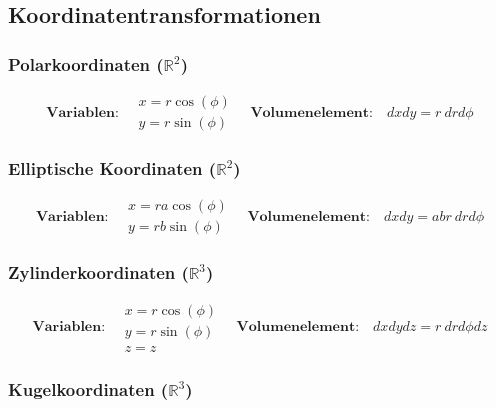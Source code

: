 \documentclass[11pt]{article}
\begin{document}
\subsection{Koordinatentransformationen}

\subsubsection{Polarkoordinaten ($\mathbb{R}^2$)}

\begin{equation*}
	\textbf{Variablen:}\quad \begin{matrix}
		x = r\cos(\phi) \\ y = r\sin(\phi)
	\end{matrix} \quad \textbf{Volumenelement:}\quad dxdy = r\ drd\phi
\end{equation*}

\subsubsection{Elliptische Koordinaten ($\mathbb{R}^2$)}

\begin{equation*}
	\textbf{Variablen:}\quad \begin{matrix}
		x = ra\cos(\phi) \\ y = rb\sin(\phi)
	\end{matrix} \quad \textbf{Volumenelement:}\quad dxdy = abr\ drd\phi
\end{equation*}

\subsubsection{Zylinderkoordinaten ($\mathbb{R}^3$)}

\begin{equation*}
	\textbf{Variablen:}\quad \begin{matrix}
		x = r\cos(\phi) \\ y = r\sin(\phi) \\ z = z
	\end{matrix} \quad \textbf{Volumenelement:}\quad dxdydz = r\ drd\phi dz
\end{equation*}

\subsubsection{Kugelkoordinaten ($\mathbb{R}^3$)}
\end{document}
